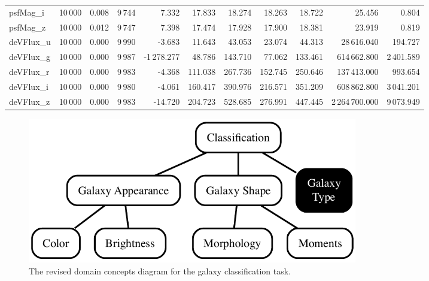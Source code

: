 \documentclass[xcolor={table}]{beamer}
\begin{document}
\begin{frame} [plain]
\begin{scriptsize}
{\begin{tabular}{  l  c  r  c r  r r r r r r}
psfMag\_i	&	10\,000	&	0.008	&	9\,744	&	7.332	&	17.833	&	18.274	&	18.263	&	18.722	&	25.456	&	0.804	\\
psfMag\_z	&	10\,000	&	0.012	&	9\,747	&	7.398	&	17.474	&	17.928	&	17.900	&	18.381	&	23.919	&	0.819	\\
deVFlux\_u	&	10\,000	&	0.000	&	9\,990	&	-3.683	&	11.643	&	43.053	&	23.074	&	44.313	&	28\,616.040	&	194.727	\\
deVFlux\_g	&	10\,000	&	0.000	&	9\,987	&	-1\,278.277	&	48.786	&	143.710	&	77.062	&	133.461	&	614\,662.800	&	2\,401.589	\\
deVFlux\_r	&	10\,000	&	0.000	&	9\,983	&	-4.368	&	111.038	&	267.736	&	152.745	&	250.646	&	137\,413.000	&	993.654	\\
deVFlux\_i	&	10\,000	&	0.000	&	9\,980	&	-4.061	&	160.417	&	390.976	&	216.571	&	351.209	&	608\,862.800	&	3\,041.201	\\
deVFlux\_z	&	10\,000	&	0.000	&	9\,983	&	-14.720	&	204.723	&	528.685	&	276.991	&	447.445	&	2\,264\,700.000	&	9\,073.949	\\
\hline
\end{tabular}}
\end{scriptsize}
\end{frame} 



 \begin{frame} 
\begin{figure}
\centering
	\includegraphics[width=0.7\textwidth]{./images/Galaxy2.pdf}

\caption{The revised domain concepts diagram for the galaxy classification task.}
\label{fig:galaxyClassDomainConcepts2}
\end{figure}
\end{frame} 
\end{document}
